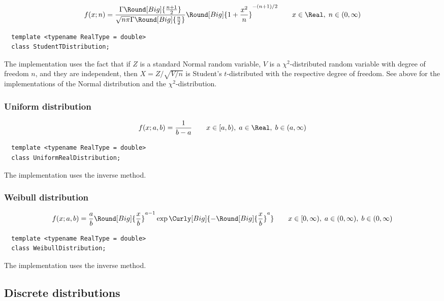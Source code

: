 \begin{equation*}
  f(x;n) =
  \frac{\Gamma\Round[Big]{\frac{n + 1}{2}}}
  {\sqrt{n\pi}\Gamma\Round[Big]{\frac{n}{2}}}
  \Round[Big]{1 + \frac{x^2}{n}}^{-(n + 1)/2} \qquad
  x \in \Real,\; n \in (0, \infty)
\end{equation*}
\begin{Verbatim}
  template <typename RealType = double>
  class StudentTDistribution;
\end{Verbatim}
The implementation uses the fact that if $Z$ is a standard Normal random
variable, $V$ is a $\chi^2$-distributed random variable with degree of freedom
$n$, and they are independent, then $X = Z / \sqrt{V / n}$ is Student's
$t$-distributed with the respective degree of freedom. See above for the
implementations of the Normal distribution and the $\chi^2$-distribution.

\subsubsection{Uniform distribution}

\begin{equation*}
  f(x;a,b) = \frac{1}{b - a} \qquad
  x \in [a, b),\; a \in \Real,\; b \in (a, \infty)
\end{equation*}
\begin{Verbatim}
  template <typename RealType = double>
  class UniformRealDistribution;
\end{Verbatim}
The implementation uses the inverse method.

\subsubsection{Weibull distribution}

\begin{equation*}
  f(x;a,b) = \frac{a}{b}\Round[Big]{\frac{x}{b}}^{a - 1}
  \exp\Curly[Big]{-\Round[Big]{\frac{x}{b}}^a} \qquad
  x \in [0, \infty),\; a \in (0, \infty),\; b \in (0, \infty)
\end{equation*}
\begin{Verbatim}
  template <typename RealType = double>
  class WeibullDistribution;
\end{Verbatim}
The implementation uses the inverse method.

\subsection{Discrete distributions}
\label{sub:Discrete distributions}

